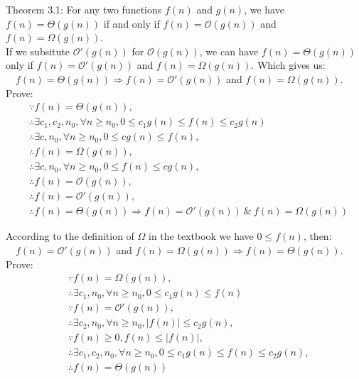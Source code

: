 \documentclass[12pt,letterpaper]{article}
\begin{document}
\begin{enumerate}
Theorem 3.1: For any two functions $f(n)$ and $g(n)$, we have $f(n) = \Theta(g(n))$ if and only if $f(n) = \mathcal{O}(g(n))$ and $f(n) = \Omega(g(n))$.\\

If we subsitute $\mathcal{O}'(g(n))$ for $\mathcal{O}(g(n))$, we can have $f(n) = \Theta(g(n))$ only if $f(n) = \mathcal{O}'(g(n))$ and $f(n) = \Omega(g(n)).$ Which gives us: \\

$ \quad f(n) = \Theta(g(n)) \Rightarrow f(n) = \mathcal{O}'(g(n)) $ and $f(n) = \Omega (g(n))$. \\
Prove:
\begin{align*}
& \because f(n) = \Theta(g(n)), \\
& \therefore \exists c_1, c_2, n_0, \forall n \ge n_0, 0 \le c_1 g(n) \le f(n) \le c_2 g(n) \\
& \therefore \exists c,n_0, \forall n \ge n_0, 0 \le c g(n) \le f(n), \\
& \therefore f(n) = \Omega(g(n)), \\
& \therefore \exists c,n_0, \forall n \ge n_0,  0 \le f(n) \le c g(n), \\
& \therefore f(n) = \mathcal{O}(g(n)), \\
& \therefore f(n) = \mathcal{O}'(g(n)), \\
& \therefore f(n) = \Theta(g(n)) \Rightarrow f(n) = \mathcal{O}'(g(n)) \ \& \ f(n) = \Omega(g(n))
\end{align*}

According to the definition of $\Omega$ in the textbook we have $0 \le f(n)$, then: \\

$ \quad f(n) = \mathcal{O}'(g(n))$ and $f(n) = \Omega (g(n)) \Rightarrow f(n) = \Theta(g(n)).$ \\
Prove:
\begin{align*}
& \because f(n) = \Omega (g(n)), \\
& \therefore \exists c_1, n_0, \forall n \ge n_0, 0 \le c_1 g(n) \le f(n) \\
& \because f(n) = \mathcal{O}'(g(n)), \\
& \therefore \exists c_2, n_0, \forall n \ge n_0, |f(n)| \le c_2 g(n), \\
& \because f(n) \ge 0, f(n) \le |f(n)|, \\
& \therefore \exists c_1, c_2, n_0, \forall n \ge n_0, 0 \le c_1 g(n) \le f(n) \le c_2 g(n), \\
& \therefore f(n) = \Theta(g(n))
\end{align*}


\end{enumerate}
\end{document}
